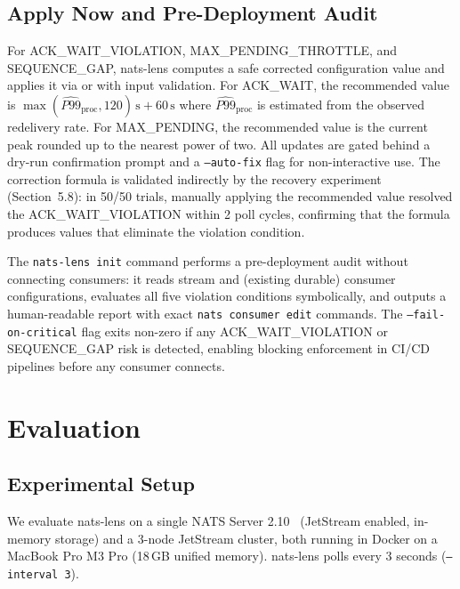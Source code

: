 \documentclass[sigconf,nonacm]{acmart}
\begin{document}
\subsection{Apply Now and Pre-Deployment Audit}

For ACK\_WAIT\_\allowbreak VIOLATION, MAX\_PENDING\_\allowbreak THROTTLE, and SEQUENCE\_GAP,
nats-lens computes a safe corrected configuration value and applies it
via  or 
with input validation. For ACK\_WAIT, the recommended value is
$\max(\hat{P99}_\mathrm{proc}, 120)\,\mathrm{s} + 60\,\mathrm{s}$
where $\hat{P99}_\mathrm{proc}$ is estimated from the observed redelivery
rate. For MAX\_PENDING, the recommended value is the current
 peak rounded up to the nearest power of two.
All updates are gated behind a dry-run confirmation prompt and a
\texttt{--auto-fix} flag for non-interactive use.
The correction formula is validated indirectly by the recovery experiment
(Section~5.8): in 50/50 trials, manually applying the recommended
 value resolved the ACK\_WAIT\_\allowbreak VIOLATION
within 2 poll cycles, confirming that the formula produces values that
eliminate the violation condition.

The \texttt{nats-lens init} command performs a pre-deployment audit
without connecting consumers: it reads stream and (existing durable)
consumer configurations, evaluates all five violation conditions
symbolically, and outputs a human-readable report with exact
\texttt{nats consumer edit} commands. The \texttt{--fail-on-critical}
flag exits non-zero if any ACK\_WAIT\_\allowbreak VIOLATION or
SEQUENCE\_GAP risk is detected, enabling blocking enforcement in CI/CD
pipelines before any consumer connects.

\section{Evaluation}

\subsection{Experimental Setup}

We evaluate nats-lens on a single NATS Server 2.10~\cite{nats-server}
(JetStream enabled, in-memory storage) and a 3-node JetStream cluster,
both running in Docker on a MacBook Pro M3 Pro (18\,GB unified memory).
nats-lens polls every 3 seconds (\texttt{--interval 3}).
\end{document}
